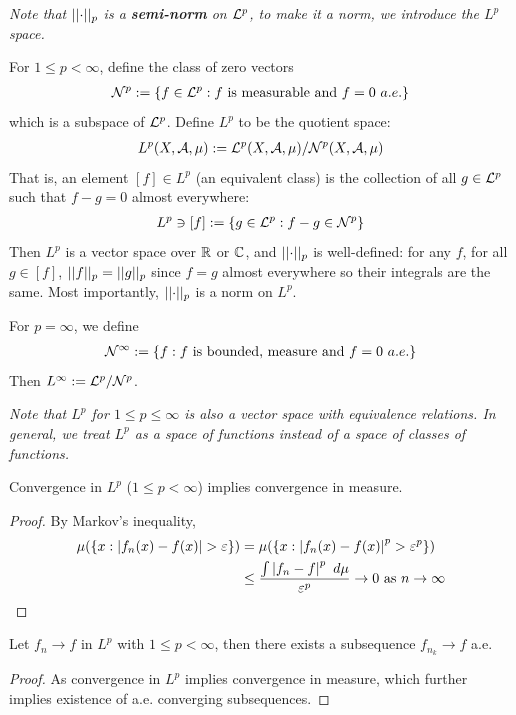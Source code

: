 \documentclass[11pt]{article}
\newcommand{\dmu}[0]{\ d\mu}
\begin{document}
	\emph{Note that $\vert \vert {\cdot} \vert \vert_p$ is a \textbf{semi-norm} on $\mathcal{{L}}^p$, to make it a norm, we introduce the $L^p$ space.}
	\begin{definition}
		For $1 \leq p < \infty$, define the class of zero vectors
		\begin{align}
			\mathcal{{N}}^p := \{f \in \mathcal{{L}}^p : f \text{{ is measurable and }} f = 0\ a.e.\}
		\end{align}
		which is a subspace of $\mathcal{{L}}^p$. Define $L^p$ to be the quotient space:
		\begin{align}
			L^p(X, \mathcal{{A}}, \mu) := \mathcal{{L}}^p(X, \mathcal{{A}}, \mu) / \mathcal{{N}}^p(X, \mathcal{{A}}, \mu)
		\end{align}
		That is, an element $[f] \in L^p$ (an equivalent class) is the collection of all $g \in \mathcal{{L}}^p$ such that $f - g = 0$ almost everywhere:
		\begin{align}
			L^p \ni [f] := \{g \in \mathcal{{L}}^p : f - g \in \mathcal{{N}}^p\}
		\end{align}
		Then $L^p$ is a vector space over $\mathbb{R}$ or $\mathbb{C}$, and $\vert \vert {\cdot} \vert \vert_p$ is well-defined: for any $f$, for all $g \in [f]$, $\vert \vert {f} \vert \vert_p = \vert \vert {g} \vert \vert_p$ since $f = g$ almost everywhere so their integrals are the same. Most importantly, $\vert \vert {\cdot} \vert \vert_p$ is a norm on $L^p$.
		
		For $p = \infty$, we define
		\begin{align}
			\mathcal{{N}}^\infty := \{f : f \text{{ is bounded, measure and }} f = 0\ a.e.\}
		\end{align}
		Then $L^\infty := \mathcal{{L}}^p / \mathcal{{N}}^p$.
	\end{definition}
	\emph{Note that $L^p$ for $1 \leq p \leq \infty$ is also a vector space with equivalence relations. In general, we treat $L^p$ as a space of functions instead of a space of classes of functions.}
	\begin{proposition}
		Convergence in $L^p$ ($1 \leq p < \infty$) implies convergence in measure.
		\begin{proof}
			By Markov's inequality,
			\begin{align}
				\mu(\{x : \abs{f_n(x) - f(x)} > \varepsilon \}) &= \mu(\{x : \abs{f_n(x) - f(x)}^p > \varepsilon^p \}) \\
				&\leq \frac{\int \abs{f_n - f}^p\dmu}{\varepsilon^p} \to 0 \tx{ as } n \to \infty
			\end{align}
		\end{proof}
	\end{proposition}
	
	\begin{corollary}
		Let $f_n \to f$ in $L^p$ with $1 \leq p < \infty$, then there exists a subsequence $f_{n_k} \to f$ a.e.
		\begin{proof}
			As convergence in $L^p$ implies convergence in measure, which further implies existence of a.e. converging subsequences.
		\end{proof}
	\end{corollary}
	
\end{document}
